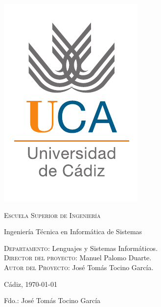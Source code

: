 {
  \thispagestyle{empty}
  \centering
  \includegraphics[width=.2\textwidth]{logo_uca}

  \bigskip
  \bigskip
  \bigskip
  
  \begin{changemargin}{3em}{3em}

    \begin{center}
      {\Huge \textsc{\nohyphens{Escuela Superior de Ingeniería}}}
      
      \bigskip
      \bigskip
      
      {\huge \nohyphens{Ingeniería Técnica en Informática de Sistemas}}
      
      \bigskip
      \bigskip
      \bigskip
      \bigskip
      
      {\LARGE \nohyphens{\nombreProyecto}}

      
      \bigskip
      \bigskip
      \bigskip
      \bigskip
      
    \end{center}
  \end{changemargin}
  \begin{changemargin}{3em}{1em}
  \begin{flushleft}
    \Large

    \textsc{Departamento}: \nohyphens{Lenguajes y Sistemas Informáticos.} \\
    \textsc{Director del proyecto}: \nohyphens{Manuel Palomo Duarte.} \\
    \textsc{Autor del Proyecto}: \nohyphens{José Tomás Tocino García}. \\
  \end{flushleft}

  \end{changemargin}  

  \bigskip
  \bigskip
  \bigskip
  
  \begin{flushright}
    \large
    Cádiz, \today

    \bigskip
    \bigskip
    \bigskip
    \bigskip    
    \bigskip
    \bigskip

    Fdo.: José Tomás Tocino García
    
  \end{flushright}

}
